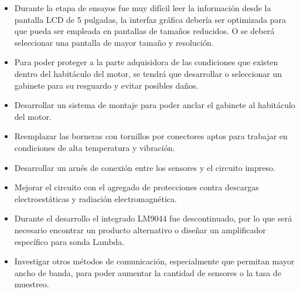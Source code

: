 \begin{itemize}
\item Durante la etapa de ensayos fue muy difícil leer la información desde la pantalla LCD de 5 pulgadas, la interfaz gráfica debería ser optimizada para que pueda ser empleada en pantallas de tamaños reducidos. O se deberá seleccionar una pantalla de mayor tamaño y resolución.

\item Para poder proteger a la parte adquisidora de las condiciones que existen dentro del habitáculo del motor, se tendrá que desarrollar o seleccionar un gabinete para su resguardo y evitar posibles daños.

\item Desarrollar un sistema de montaje para poder anclar el gabinete al habitáculo del motor.

\item Reemplazar las borneras con tornillos por conectores aptos para trabajar en condiciones de alta temperatura y vibración.

\item Desarrollar un arnés de conexión entre los sensores y el circuito impreso.

\item Mejorar el circuito con el agregado de protecciones contra descargas electroestáticas y radiación electromagnética.

\item Durante el desarrollo el integrado LM9044 fue descontinuado, por lo que será necesario encontrar un producto alternativo o diseñar un amplificador específico para sonda Lambda.

\item Investigar otros métodos de comunicación, especialmente que permitan mayor ancho de banda, para poder aumentar la cantidad de sensores o la tasa de muestreo.

\end{itemize}



